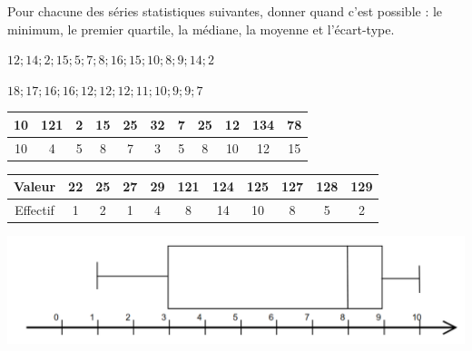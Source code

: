 Pour chacune des séries statistiques suivantes, donner quand c'est possible : le minimum, le premier quartile, la médiane, la moyenne et l'écart-type.

\begin{questions}
	\question[2] $12; 14 ; 2 ;  15 ; 5 ; 7 ; 8 ; 16 ; 15; 10 ; 8 ; 9 ; 14 ; 2$
	
	\fillwithdottedlines{5cm}
	
%	
	
	
	\question[2] $18; 17 ; 16 ; 16 ; 12 ; 12 ; 12 ; 11 ; 10 ; 9 ; 9 ; 7$
	
	\fillwithdottedlines{5cm}
	

	
	\question[2] 
	\begin{tabular}{|@{\ \ }c@{\ \ }|@{\ \ }c@{\ \ }|@{\ \ }c@{\ \ }|@{\ \ }c@{\ \ }|@{\ \ }c@{\ \ }|@{\ \ }c@{\ \ }|@{\ \ }c@{\ \ }|@{\ \ }c@{\ \ }|@{\ \ }c@{\ \ }|@{\ \ }c@{\ \ }|@{\ \ }c@{\ \ }|}
		\hline
		10 & 121 & 2 & 15 & 25 & 32 & 7 & 25 & 12 & 134 & 78 \\ \hline
		10 & 4   & 5 & 8  & 7  & 3  & 5 & 8  & 10 & 12  & 15 \\ \hline
	\end{tabular}
	
	\fillwithdottedlines{5cm}
	
	\newpage
	
	\question[2] 
	
	\begin{tabular}{|@{\ \ }c@{\ \ }|@{\ \ }c@{\ \ }|@{\ \ }c@{\ \ }|@{\ \ }c@{\ \ }|@{\ \ }c@{\ \ }|@{\ \ }c@{\ \ }|@{\ \ }c@{\ \ }|@{\ \ }c@{\ \ }|@{\ \ }c@{\ \ }|@{\ \ }c@{\ \ }|@{\ \ }c@{\ \ }|}
		\hline
		Valeur   & 22 & 25 & 27 & 29 & 121 & 124 & 125 & 127 & 128 & 129 \\ \hline
		Effectif & 1 & 2 & 1 & 4 & 8  & 14 & 10 & 8  & 5  & 2  \\ \hline
	\end{tabular}
	
	\fillwithdottedlines{5cm}
	
	\question[2] 
	
	\begin{center}
		\includegraphics[scale=0.3]{boite1}
	\end{center} 

	\fillwithdottedlines{5cm}
	
\end{questions}